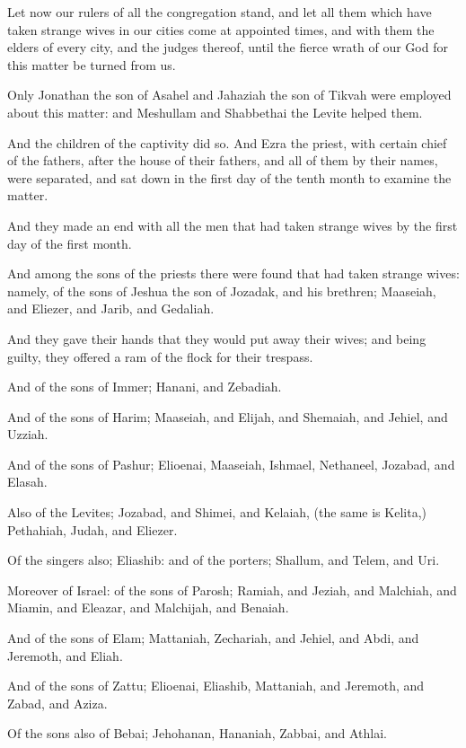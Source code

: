 \Verse Let now our rulers of all the congregation stand, and let all them which have taken strange wives in our cities come at appointed times, and with them the elders of every city, and the judges thereof, until the fierce wrath of our God for this matter be turned from us.

\Verse Only Jonathan the son of Asahel and Jahaziah the son of Tikvah were employed about this matter: and Meshullam and Shabbethai the Levite helped them.

\Verse And the children of the captivity did so. And Ezra the priest, with certain chief of the fathers, after the house of their fathers, and all of them by their names, were separated, and sat down in the first day of the tenth month to examine the matter.

\Verse And they made an end with all the men that had taken strange wives by the first day of the first month.

\Verse And among the sons of the priests there were found that had taken strange wives: namely, of the sons of Jeshua the son of Jozadak, and his brethren; Maaseiah, and Eliezer, and Jarib, and Gedaliah.

\Verse And they gave their hands that they would put away their wives; and being guilty, they offered a ram of the flock for their trespass.

\Verse And of the sons of Immer; Hanani, and Zebadiah.

\Verse And of the sons of Harim; Maaseiah, and Elijah, and Shemaiah, and Jehiel, and Uzziah.

\Verse And of the sons of Pashur; Elioenai, Maaseiah, Ishmael, Nethaneel, Jozabad, and Elasah.

\Verse Also of the Levites; Jozabad, and Shimei, and Kelaiah, (the same is Kelita,) Pethahiah, Judah, and Eliezer.

\Verse Of the singers also; Eliashib: and of the porters; Shallum, and Telem, and Uri.

\Verse Moreover of Israel: of the sons of Parosh; Ramiah, and Jeziah, and Malchiah, and Miamin, and Eleazar, and Malchijah, and Benaiah.

\Verse And of the sons of Elam; Mattaniah, Zechariah, and Jehiel, and Abdi, and Jeremoth, and Eliah.

\Verse And of the sons of Zattu; Elioenai, Eliashib, Mattaniah, and Jeremoth, and Zabad, and Aziza.

\Verse Of the sons also of Bebai; Jehohanan, Hananiah, Zabbai, and Athlai.

